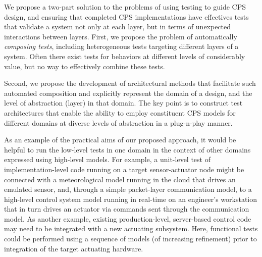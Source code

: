 We propose a two-part solution to the problems of using testing to guide CPS design, and ensuring that completed CPS implementations have effectives tests that validate a system not only at each layer, but in terms of unexpected interactions between layers.  First, we propose the problem of automatically \emph{composing tests}, including heterogeneous tests targeting different layers of a system.  Often there exist tests for behaviors at different levels of considerably value, but no way to effectively combine these tests.

Second, we propose the development of architectural methods that facilitate such automated composition and explicitly represent the domain of a design, and the level of abstraction (layer) in that domain.  The key point is to construct test architectures  that enable the ability to employ constituent CPS models for different domains at diverse levels of abstraction in a plug-n-play manner.

As an example of the practical aims of our proposed approach, it would be helpful to run the low-level tests in one domain in the context of other domains expressed using high-level models. For example, a unit-level test of implementation-level code running on a target sensor-actuator node might be connected with a meteorological model running in the cloud that drives an emulated sensor, and, through a simple packet-layer communication model, to a high-level control system model running in real-time on an engineer's workstation that in turn drives an actuator via commands sent through the communication model. As another example, existing production-level, server-based control code may need to be integrated with a new actuating subsystem. Here, functional tests could be performed using a sequence of models (of increasing refinement) prior to integration of the target actuating hardware.

